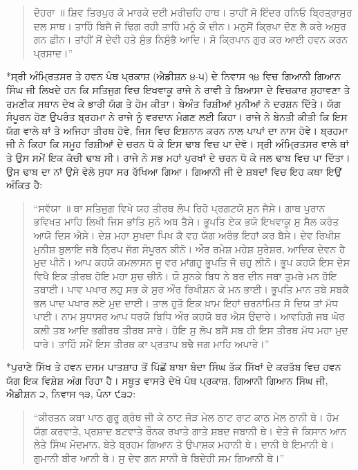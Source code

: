 \documentclass[12pt,a5paper,twoside]{book}  %
\makeatletter
\renewcommand\section{\@startsection{section}{1}{0pt}{1.2em}{0.6em}{\punjabifont\Large\bfseries}}%
\makeatother
\begin{document}
{\begin{quote}
ਦੋਹਰਾ ॥ ਸ਼ਿਵ ਤਿਰਪੁਰ ਕੋ ਮਾਰਕੇ ਦਈ ਮਰੀਚਹਿ ਹਾਥ। ਤਾਹੀਂ ਸੋ ਇੰਦਰ ਹਨਿਓ ਬ੍ਰਿਤ੍ਰਾਸੁਰ ਦਲ ਸਾਥ। ਤਾਹਿੰ ਬਿਜੈ ਜੋ ਢਿਗ ਰਹੀ ਤਾਹਿੰ ਮਨੂੰ ਕੋ ਦੀਨ। ਮਨੁਸੋਂ ਕ੍ਰਿਪਾ ਦੋਣ ਲੈ ਕਰੇ ਅਸੁਰ ਗਨ ਛੀਨ। ਤਾਂਹੀਂ ਸੋਂ ਦੇਵੀ ਹਤੇ ਸੁੰਭ ਨਿਸੁੰਭੈ ਆਦਿ। ਸੋ ਕ੍ਰਿਪਾਨ ਗੁਰ ਕਰ ਆਈ ਹਵਨ ਕਰਨ ਪ੍ਰਸਾਦ।”
\end{quote}

\section*{ਸ੍ਰੀ ਅੰਮ੍ਰਿਤਸਰ ਤੇ ਹਵਨ}
ਪੰਥ ਪ੍ਰਕਾਸ਼ (ਐਡੀਸ਼ਨ ੪-੫) ਦੇ ਨਿਵਾਸ ੧੪ ਵਿਚ ਗਿਆਨੀ ਗਿਆਨ ਸਿੰਘ ਜੀ ਲਿਖਦੇ ਹਨ ਕਿ ਸਤਿਜੁਗ ਵਿਚ ਇਖਵਾਕੂ ਰਾਜੇ ਨੇ ਰਾਵੀ ਤੇ ਬਿਆਸਾ ਦੇ ਵਿਚਕਾਰ ਸੁਹਾਵਣਾ ਤੇ ਰਮਣੀਕ ਸਥਾਨ ਦੇਖ ਕੇ ਭਾਰੀ ਯੱਗ ਤੇ ਹੋਮ ਕੀਤਾ। ਬੇਅੰਤ ਰਿਸ਼ੀਆਂ ਮੁਨੀਆਂ ਨੇ ਦਰਸ਼ਨ ਦਿੱਤੇ। ਯੱਗ ਸੰਪੂਰਨ ਹੋਣ ਉਪਰੰਤ ਬ੍ਰਹਮਾ ਨੇ ਰਾਜੇ ਨੂੰ ਵਰਦਾਨ ਮੰਗਣ ਲਈ ਕਿਹਾ। ਰਾਜੇ ਨੇ ਬੇਨਤੀ ਕੀਤੀ ਕਿ ਇਸ ਯੱਗ ਵਾਲੇ ਥਾਂ ਤੇ ਅਜਿਹਾ ਤੀਰਥ ਹੋਵੇ, ਜਿਸ ਵਿਚ ਇਸ਼ਨਾਨ ਕਰਨ ਨਾਲ ਪਾਪਾਂ ਦਾ ਨਾਸ ਹੋਵੇ। ਬ੍ਰਹਮਾ ਜੀ ਨੇ ਕਿਹਾ ਕਿ ਸਮੂਹ ਰਿਸ਼ੀਆਂ ਦੇ ਚਰਨ ਧੋ ਕੇ ਇਸ ਢਾਬ ਵਿਚ ਪਾ ਦੇਵੋ। ਸ੍ਰੀ ਅੰਮ੍ਰਿਤਸਰ ਵਾਲੇ ਥਾਂ ਤੇ ਉਸ ਸਮੇਂ ਇਕ ਕੱਚੀ ਢਾਬ ਸੀ। ਰਾਜੇ ਨੇ ਸਭ ਮਹਾਂ ਪੁਰਖਾਂ ਦੇ ਚਰਨ ਧੋ ਕੇ ਜਲ ਢਾਬ ਵਿਚ ਪਾ ਦਿੱਤਾ। ਉਸ ਢਾਬ ਦਾ ਨਾਂ ਉਸੇ ਵੇਲੇ ਸੁਧਾ ਸਰ ਰੱਖਿਆ ਗਿਆ। ਗਿਆਨੀ ਜੀ ਦੇ ਸ਼ਬਦਾਂ ਵਿਚ ਇਹ ਕਥਾ ਇਉਂ ਅੰਕਿਤ ਹੈ:
\begin{quote}
“ਸਵੱਯਾ ॥ ਥਾ ਸਤਿਜੁਗ ਵਿਖੇ ਯਹ ਤੀਰਥ ਲੋਪ ਰਿਹੋ ਪ੍ਰਗਟਯੋ ਸੁਨ ਜੈਸੇ। ਗਾਥ ਪੁਰਾਨ ਭਵਿਖਤ ਮਾਹਿ ਲਿਖੀ ਜਿਸ ਭਾਂਤਿ ਸੁਨੋ ਅਬ ਤੈਸੇ। ਭੂਪਤਿ ਏਕ ਭਯੋ ਇਖਵਾਕੂ ਸੁ ਸੈਲ ਕਰੰਤ ਆਯੋ ਦਿਸ ਐਸੇ। ਦੇਸ਼ ਮਹਾ ਸੁਖਦਾ ਪਿਖ ਕੈ ਵਹ ਯੱਗ ਅਰੰਭ ਇਹਾਂ ਕਰ ਬੈਸੇ। ਦੇਵ ਰਿਖੀਸ਼ ਮੁਨੀਸ਼ ਬੁਲਾਇ ਜਬੈ ਨ੍ਰਿਪ ਜੱਗ ਸੰਪੂਰਨ ਕੀਨੋ। ਔਰ ਰਮੇਸ਼ ਮਹੇਸ਼ ਸੁਰੇਸ਼ਰ, ਆਦਿਕ ਦੇਵਨ ਹੈ ਮੁਦ ਪੀਨੋ। ਆਪ ਕਹਯੋ ਕਮਲਾਸਨ ਜੂ ਵਰ ਮਾਂਗਹੁ ਭੂਪਤਿ ਜੋ ਚਹੁ ਲੀਨੋ। ਭੂਪ ਕਹਯੋ ਇਸ ਦੇਸ ਵਿਖੈ ਇਕ ਤੀਰਥ ਹੋਇ ਮਹਾ ਸੁਚ ਚੀਨੋ। ਯੌ ਸੁਨਕੇ ਬਿਧ ਨੇ ਬਰ ਦੀਨ ਜਥਾ ਤੁਮਰੇ ਮਨ ਹੋਇ ਤਥਾਈ। ਪਾਵ ਪਖਾਰ ਲਹੁ ਸਭ ਕੇ ਸੁਰ ਔਰ ਰਿਖੀਸ਼ਨ ਕੇ ਮਨ ਭਾਈ। ਭੂਪਤਿ ਮਾਨ ਤਬੇ ਸਬਕੈ ਭਲ ਪਾਦ ਪਖਾਰ ਲਏ ਮੁਦ ਦਾਈ। ਤਾਲ ਹੁਤੋ ਇਕ ਖ਼ਾਮ ਇਹਾਂ ਚਰਨਾਂਮਿਤ ਸੋ ਦਿਯ ਤਾਂ ਮੱਧ ਪਾਈ। ਨਾਮ ਸੁਧਾਸਰ ਆਪ ਧਰਯੋ ਬਿਧਿ ਔਰ ਕਹਯੋ ਬਰ ਐਸ ਉਦਾਰੇ। ਆਵਹਿਗੋ ਜਬ ਘੋਰ ਕਲੀ ਤਬ ਆਦਿ ਭਗੀਰਥ ਤੀਰਥ ਸਾਰੇ। ਹੋਇ ਸੁ ਲੋਪ ਬਸੈਂ ਸਬ ਹੀ ਇਸ ਤੀਰਥ ਮੱਧ ਮਹਾ ਮੁਦ ਧਾਰੇ। ਤਾਹਿੰ ਸਮੇਂ ਇਸ ਤੀਰਥ ਕਾ ਪ੍ਰਤਾਪ ਬਢੈ ਜਗ ਮਾਹਿ ਅਪਾਰੇ।”
\end{quote}

\section*{ਪੁਰਾਣੇ ਸਿੱਖ ਤੇ ਹਵਨ}
ਦਸਮ ਪਾਤਸ਼ਾਹ ਤੋਂ ਪਿੱਛੋਂ ਬਾਬਾ ਬੰਦਾ ਸਿੰਘ ਤੱਕ ਸਿੱਖਾਂ ਦੇ ਕਰਤੱਬ ਵਿਚ ਹਵਨ ਯੱਗ ਇਕ ਵਿਸ਼ੇਸ਼ ਅੰਗ ਰਿਹਾ ਹੈ। ਸਬੂਤ ਵਾਸਤੇ ਦੇਖੋ ਪੰਥ ਪ੍ਰਕਾਸ਼, ਗਿਆਨੀ ਗਿਆਨ ਸਿੰਘ ਜੀ, ਐਡੀਸ਼ਨ ੨, ਨਿਵਾਸ ੧੩, ਪੰਨਾ ੯੩੨:
\begin{quote}
“ਕੀਰਤਨ ਕਥਾ ਪਾਠ ਗੁਰੂ ਗ੍ਰੰਥ ਜੀ ਕੇ ਠਾਟ ਜੋੜ ਮੇਲ ਠਾਟ ਰਾਟ ਕਾਠ ਮੇਲ ਠਾਨੀ ਥੇ। ਹੋਮ ਯੱਗ ਕਰਵਾਤੇ, ਪ੍ਰਸ਼ਾਦ ਬਟਵਾਤੇ ਰੌਨਕ ਰਖਾਤੇ ਗਾਤੇ ਸ਼ਬਦ ਜਬਾਨੀ ਥੇ। ਦੇਤੇ ਜੋ ਕਿਸਾਨ ਆਨ ਲੇਤੇ ਸਿੰਘ ਮੋਦਮਾਨ, ਬੇਤੇ ਬ੍ਰਹਮ ਗਿਆਨ ਤੇ ਉਪਾਸ਼ਕ ਮਹਾਨੀ ਥੇ। ਦਾਨੀ ਥੇ ਇਮਾਨੀ ਥੇ। ਗੁਮਾਨੀ ਬੀਰ ਆਨੀ ਥੇ। ਸੁ ਦੇਵ ਗਨ ਸਾਨੀ ਥੇ ਬਿਦੇਹੀ ਸਮ ਗਿਆਨੀ ਥੇ।”
\end{quote}

}
\end{document}
